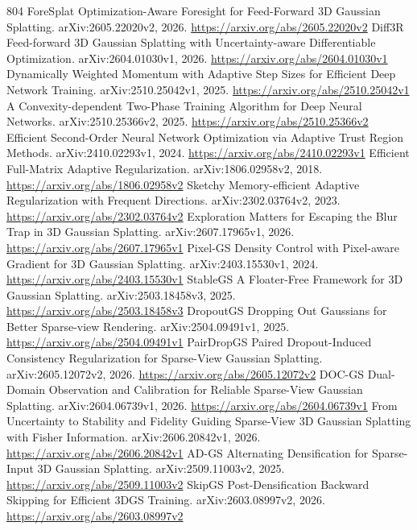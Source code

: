 \documentclass[11pt]{article}
\begin{document}
\begin{thebibliography}{804}
 ForeSplat Optimization-Aware Foresight for Feed-Forward 3D Gaussian Splatting. arXiv:2605.22020v2, 2026. \url{https://arxiv.org/abs/2605.22020v2}
 Diff3R Feed-forward 3D Gaussian Splatting with Uncertainty-aware Differentiable Optimization. arXiv:2604.01030v1, 2026. \url{https://arxiv.org/abs/2604.01030v1}
 Dynamically Weighted Momentum with Adaptive Step Sizes for Efficient Deep Network Training. arXiv:2510.25042v1, 2025. \url{https://arxiv.org/abs/2510.25042v1}
 A Convexity-dependent Two-Phase Training Algorithm for Deep Neural Networks. arXiv:2510.25366v2, 2025. \url{https://arxiv.org/abs/2510.25366v2}
 Efficient Second-Order Neural Network Optimization via Adaptive Trust Region Methods. arXiv:2410.02293v1, 2024. \url{https://arxiv.org/abs/2410.02293v1}
 Efficient Full-Matrix Adaptive Regularization. arXiv:1806.02958v2, 2018. \url{https://arxiv.org/abs/1806.02958v2}
 Sketchy Memory-efficient Adaptive Regularization with Frequent Directions. arXiv:2302.03764v2, 2023. \url{https://arxiv.org/abs/2302.03764v2}
 Exploration Matters for Escaping the Blur Trap in 3D Gaussian Splatting. arXiv:2607.17965v1, 2026. \url{https://arxiv.org/abs/2607.17965v1}
 Pixel-GS Density Control with Pixel-aware Gradient for 3D Gaussian Splatting. arXiv:2403.15530v1, 2024. \url{https://arxiv.org/abs/2403.15530v1}
 StableGS A Floater-Free Framework for 3D Gaussian Splatting. arXiv:2503.18458v3, 2025. \url{https://arxiv.org/abs/2503.18458v3}
 DropoutGS Dropping Out Gaussians for Better Sparse-view Rendering. arXiv:2504.09491v1, 2025. \url{https://arxiv.org/abs/2504.09491v1}
 PairDropGS Paired Dropout-Induced Consistency Regularization for Sparse-View Gaussian Splatting. arXiv:2605.12072v2, 2026. \url{https://arxiv.org/abs/2605.12072v2}
 DOC-GS Dual-Domain Observation and Calibration for Reliable Sparse-View Gaussian Splatting. arXiv:2604.06739v1, 2026. \url{https://arxiv.org/abs/2604.06739v1}
 From Uncertainty to Stability and Fidelity Guiding Sparse-View 3D Gaussian Splatting with Fisher Information. arXiv:2606.20842v1, 2026. \url{https://arxiv.org/abs/2606.20842v1}
 AD-GS Alternating Densification for Sparse-Input 3D Gaussian Splatting. arXiv:2509.11003v2, 2025. \url{https://arxiv.org/abs/2509.11003v2}
 SkipGS Post-Densification Backward Skipping for Efficient 3DGS Training. arXiv:2603.08997v2, 2026. \url{https://arxiv.org/abs/2603.08997v2}

\end{thebibliography}
\end{document}
